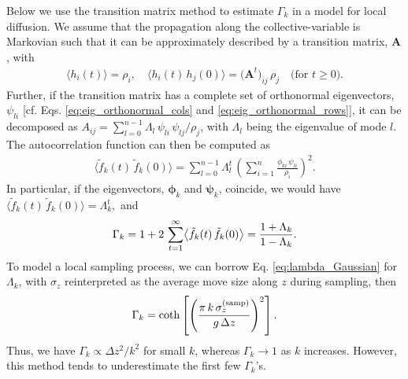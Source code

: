 \documentclass[reprint, superscriptaddress, floatfix]{revtex4-1}
\begin{document}
Below we use the transition matrix method
to estimate $\Gamma_k$ in a model for local diffusion\cite{bussi2006}.
%
We assume that the propagation along the collective-variable is Markovian
such that it can be approximately
described by a transition matrix, $\mathbf A$, with
\begin{align*}
\langle h_i(t) \rangle = \rho_i,
\quad
\langle h_i(t) \, h_j(0) \rangle = \bigl(\mathbf A^t\bigr)_{ij} \, \rho_j
\quad \mbox{(for $t \ge 0$)}
.
\end{align*}
Further, if the transition matrix %
has a complete set of orthonormal eigenvectors, $\psi_{li}$
[cf. Eqs. \eqref{eq:eig_orthonormal_cols} and
\eqref{eq:eig_orthonormal_rows}],
it can be decomposed as
$A_{ij} = \sum_{l=0}^{n-1} \Lambda_l \, \psi_{li} \, \psi_{lj} / \rho_j$,
with $\Lambda_l$ being the eigenvalue of mode $l$.
%
The autocorrelation function can then be computed as
%
\begin{align*}
\bigl\langle
  \tilde f_k(t) \, \tilde f_k(0)
\bigr\rangle
=
\sum_{l = 0}^{n-1} \Lambda_l^t \,
\left(
  \sum_{i=1}^n \frac{ \phi_{ki} \, \psi_{li} }{ \rho_i }
\right)^2
.
\end{align*}
%
In particular, if the eigenvectors, $\pmb \phi_k$
and $\pmb \psi_k$, coincide,
we would have
$\bigl\langle
  \tilde f_k(t) \, \tilde f_k(0)
\bigr\rangle
=
\Lambda_k^t,$
and
\begin{equation}
  \Gamma_k = 1 + 2 \, \sum_{t=1}^\infty
  \bigl\langle
    \tilde f_k(t) \, \tilde f_k(0)
  \bigr\rangle
  = \frac{1+\Lambda_k}{1-\Lambda_k}
  .
  \notag
\end{equation}
%
To model a local sampling process,
we can borrow Eq. \eqref{eq:lambda_Gaussian} for $\Lambda_k$,
with $\sigma_z$ reinterpreted as
the average move size along $z$ during sampling,
then
\begin{align}
\Gamma_k = \coth\left[
  \left(
    \frac{ \pi \, k \, \sigma_z^\mathrm{(samp)} } { g \, \Delta z}
  \right)^2
  \right].
  \notag
\end{align}
Thus, we have $\Gamma_k \propto \Delta z^2/k^2$
for small $k$,\cite{bussi2006}
whereas $\Gamma_k \to 1$ as $k$ increases.
%
However, this method tends to underestimate
the first few $\Gamma_k$'s.
%
%
\end{document}
